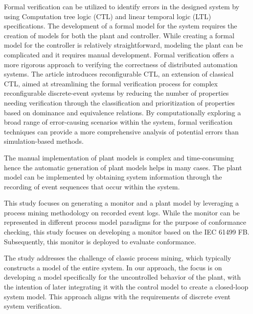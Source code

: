 \begin{bibunit}
Formal verification \cite{patil2015formal,blech2016comparison} can be utilized to identify errors in the designed system by using Computation tree logic (CTL) and linear temporal logic (LTL) specifications. The development of a formal model for the system requires the creation of models for both the plant and controller. While creating a formal model for the controller is relatively straightforward, modeling the plant can be complicated and it requires manual development. Formal verification \cite{cengic2010formal1} offers a more rigorous approach to verifying the correctness of distributed automation systems. The article \cite{ramdani2020rctl} introduces reconfigurable CTL, an extension of classical CTL, aimed at streamlining the formal verification process for complex reconfigurable discrete-event systems by reducing the number of properties needing verification through the classification and prioritization of properties based on dominance and equivalence relations. By computationally exploring a broad range of error-causing scenarios within the system, formal verification techniques can provide a more comprehensive analysis of potential errors than simulation-based methods.

The manual implementation of plant models \cite{hanisch2009one, hegny2010iec} is complex and time-consuming hence the automatic generation of plant models \cite{xavier2021plant, xavier2022plant}  helps in many cases. The plant model can be implemented by obtaining system information through the recording of event sequences that occur within the system. 


This study focuses on generating a monitor and a plant model by leveraging a process mining methodology on recorded event logs. While the monitor can be represented in different process model paradigms for the purpose of conformance checking, this study focuses on developing a monitor based on the IEC 61499 FB. Subsequently, this monitor is deployed to evaluate conformance.


The study addresses the challenge of classic process mining, which typically constructs a model of the entire system. In our approach, the focus is on developing a model specifically for the uncontrolled behavior of the plant, with the intention of later integrating it with the control model to create a closed-loop system model. This approach aligns with the requirements of discrete event system verification.




\end{bibunit}
